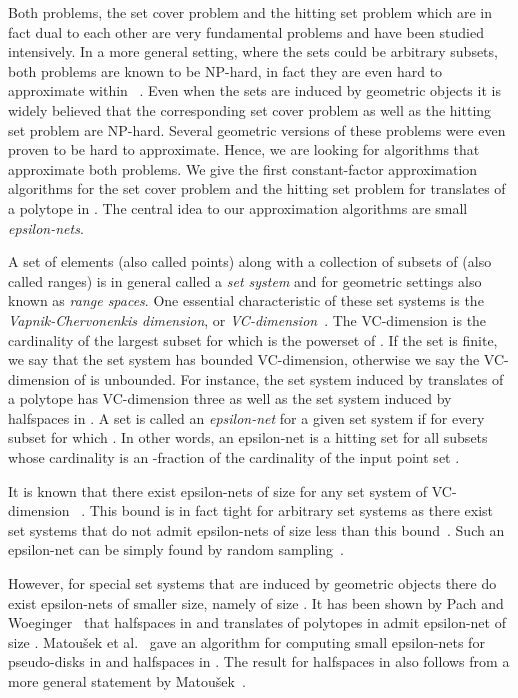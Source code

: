 \documentclass{stacs_proc}
\begin{document}
Both problems, the set cover problem and the hitting set problem which
are in fact dual to each other are very fundamental problems and have
been studied intensively. In a more general setting, where the sets
could be arbitrary subsets, both problems are known to be NP-hard, in
fact they are even hard to approximate within ~\cite{LY94}. Even when the sets are induced by geometric objects
it is widely believed that the corresponding set cover problem as well
as the hitting set problem are NP-hard. Several geometric versions of
these problems were even proven to be hard to approximate. Hence, we
are looking for algorithms that approximate both problems. We give the
first constant-factor approximation algorithms for the set cover
problem and the hitting set problem for translates of a polytope in
. The central idea to our approximation algorithms are small
\emph{epsilon-nets}. 

A set of elements  (also called points) along with a collection
 of subsets of  (also called ranges) is in general called a
\emph{set system}  and for geometric settings also known as
\emph{range spaces}. One essential characteristic of these set systems
is the \emph{Vapnik-Chervonenkis dimension}, or
\emph{VC-dimension}~\cite{VC71}. The VC-dimension is the cardinality
of the largest subset  for which  is the powerset
of . If the set  is finite, we say that the set system 
has bounded 
VC-dimension, otherwise we say the VC-dimension of  is 
unbounded. For instance, the set system induced by translates of a
polytope has VC-dimension three as well as the set system induced by
halfspaces in .  A set  is called an \emph{epsilon-net} for
a given set system  if  for every subset  for
which . In other words, an epsilon-net is a hitting set
for all subsets  whose cardinality is an -fraction of the
cardinality of the input point set .  

It is known that there exist epsilon-nets of size
 for any set system of
VC-dimension ~\cite{BEHW89, KPW92}. This bound is in fact tight for
arbitrary set systems as there exist set systems that do not admit
epsilon-nets of size less than this bound~\cite{PW90}. Such an
epsilon-net can be simply found by random sampling~\cite{M}. 

However, for special set systems that are induced by geometric objects
there do exist epsilon-nets of smaller size, namely of size
. It has been shown by Pach and
Woeginger~\cite{PW90} that halfspaces in  and translates of
polytopes in  admit epsilon-net of size
. Matou\v{s}ek et al.~\cite{MSW90} gave an
algorithm for computing  small epsilon-nets for pseudo-disks in 
and halfspaces in . The result for halfspaces in  also
follows from a more general statement by Matou\v{s}ek~\cite{M92}.  
\end{document}
